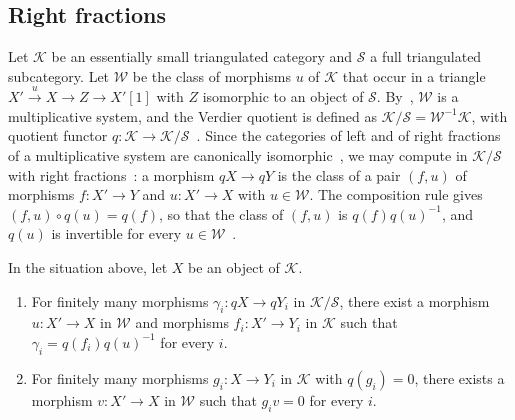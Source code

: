 \subsection{Right fractions}
\label{subsec:fractions}

Let $\mathcal{K}$ be an essentially small triangulated category and
$\mathcal{S}$ a full triangulated subcategory. Let $\mathcal{W}$ be the class of
morphisms $u$ of
$\mathcal{K}$ that occur in a triangle ${X'\xrightarrow{u}X\to Z\to X'[1]}$ with
$Z$ isomorphic to an object of $\mathcal{S}$. By~\cite[Tag~05RG,
Lemma~13.6.6]{Stacks}, $\mathcal{W}$ is a multiplicative system, and the
Verdier quotient is defined as
${\mathcal{K}/\mathcal{S}=\mathcal{W}^{-1}\mathcal{K}}$, with quotient functor
${q\colon\mathcal{K}\to\mathcal{K}/\mathcal{S}}$~\cite[Tag~05RI,
Definition~13.6.7]{Stacks}. Since the categories of left and of right
fractions of a multiplicative system are canonically
isomorphic~\cite[Tag~04VL, Lemma~4.27.19]{Stacks}, we may compute in
$\mathcal{K}/\mathcal{S}$ with right fractions~\cite[Tag~04VH,
Lemma~4.27.11]{Stacks}: a morphism ${qX\to qY}$ is the class of a pair $(f,u)$ of
morphisms ${f\colon X'\to Y}$ and ${u\colon X'\to X}$ with ${u\in\mathcal{W}}$. The
composition rule gives ${(f,u)\circ q(u)=q(f)}$, so that the class of $(f,u)$ is
$q(f)q(u)^{-1}$, and $q(u)$ is invertible for every
${u\in\mathcal{W}}$~\cite[Tag~04VK, Lemma~4.27.16]{Stacks}.

\begin{lemma}
  \label{lemma:fractions}
  In the situation above, let $X$ be an object of $\mathcal{K}$.
  \begin{enumerate}
    \item\label{it:fractions-denominator} For finitely many morphisms
      ${\gamma_i\colon qX\to qY_i}$ in $\mathcal{K}/\mathcal{S}$, there exist a
      morphism ${u\colon X'\to X}$ in $\mathcal{W}$ and morphisms
      ${f_i\colon X'\to Y_i}$ in $\mathcal{K}$ such that
      ${\gamma_i=q(f_i)q(u)^{-1}}$ for every $i$.
    \item\label{it:fractions-kill} For finitely many morphisms
      ${g_i\colon X\to Y_i}$ in $\mathcal{K}$ with ${q(g_i)=0}$, there exists a
      morphism ${v\colon X'\to X}$ in $\mathcal{W}$ such that ${g_iv=0}$ for every
      $i$.
  \end{enumerate}
\end{lemma}

